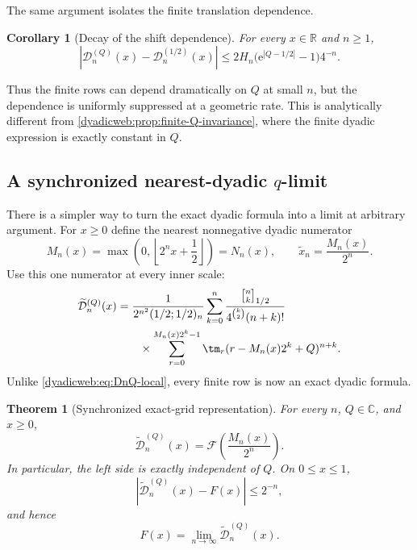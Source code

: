 \documentclass[11pt,oneside]{article}
\newtheorem{theorem}{Theorem}[section]
\newtheorem{corollary}[corollary]{Corollary}
\theoremstyle{definition}
\theoremstyle{remark}
\newcommand{\R}{\mathbb R}
\newcommand{\C}{\mathbb C}
\newcommand{\e}{\mathrm e}
\newcommand{\qbinom}[3]{\genfrac{[}{]}{0pt}{}{#1}{#2}_{#3}}
\begin{document}
The same argument isolates the finite translation dependence.

\begin{corollary}[Decay of the shift dependence]
\label{dyadicweb:cor:D-Q-decay}
For every $x\in\R$ and $n\ge1$,
\begin{equation}
 |\mathcal D_n^{(Q)}(x)-\mathcal D_n^{(1/2)}(x)|
 \le2H_n\bigl(\e^{|Q-1/2|}-1\bigr)4^{-n}.                \label{dyadicweb:eq:D-Q-decay}
\end{equation}
\end{corollary}

Thus the finite rows can depend dramatically on $Q$ at small $n$, but the dependence is
uniformly suppressed at a geometric rate.  This is analytically different from
\cref{dyadicweb:prop:finite-Q-invariance}, where the finite dyadic expression is exactly constant in
$Q$.

\subsection[A synchronized nearest-dyadic q-limit]{A synchronized nearest-dyadic $q$-limit}
\label{dyadicweb:subsec:synchronized}

There is a simpler way to turn the exact dyadic formula into a limit at arbitrary argument.
For $x\ge0$ define the nearest nonnegative dyadic numerator
\begin{equation}
 M_n(x)=\max\!\left(0,\left\lfloor2^nx+\frac12\right\rfloor\right)=N_n(x),
 \qquad
 \widetilde x_n=\frac{M_n(x)}{2^n}.                        \label{dyadicweb:eq:nearest-dyadic}
\end{equation}
Use this one numerator at every inner scale:
\begin{align}
 \widetilde{\mathcal D}_n^{(Q)}(x)
 &=\frac1{2^{n^2}(1/2;1/2)_n}
 \sum_{k=0}^{n}
 \frac{\qbinom nk{1/2}}{4^{\binom k2}(n+k)!}             \notag\\
 &\qquad\times
 \sum_{r=0}^{M_n(x)2^k-1}\tm_r
       (r-M_n(x)2^k+Q)^{n+k}.                             \label{dyadicweb:eq:synchronized-D}
\end{align}
Unlike \eqref{dyadicweb:eq:DnQ-local}, every finite row is now an exact dyadic formula.

\begin{theorem}[Synchronized exact-grid representation]
\label{dyadicweb:thm:synchronized}
For every $n$, $Q\in\C$, and $x\ge0$,
\begin{equation}
 \boxed{
 \widetilde{\mathcal D}_n^{(Q)}(x)
 =\mathcal F\!\left(\frac{M_n(x)}{2^n}\right).}           \label{dyadicweb:eq:synchronized-exact}
\end{equation}
In particular, the left side is exactly independent of $Q$.  On $0\le x\le1$,
\begin{equation}
 \left|\widetilde{\mathcal D}_n^{(Q)}(x)-F(x)\right|
 \le2^{-n},                                                \label{dyadicweb:eq:synchronized-error}
\end{equation}
and hence
\begin{equation}
 F(x)=\lim_{n\to\infty}\widetilde{\mathcal D}_n^{(Q)}(x). \label{dyadicweb:eq:synchronized-limit}
\end{equation}
\end{theorem}
\end{document}
